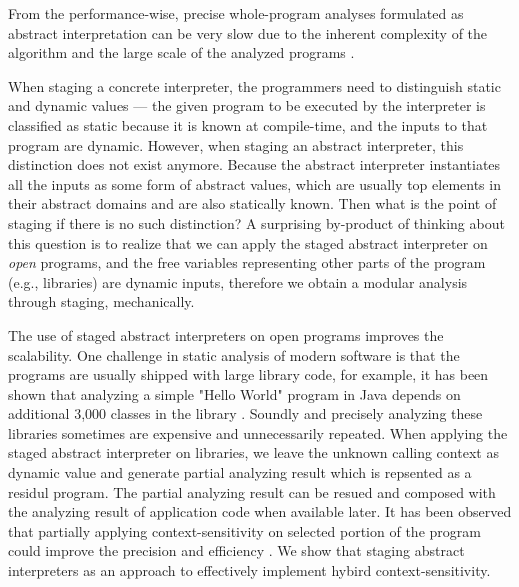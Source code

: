 

From the performance-wise, precise whole-program analyses formulated as abstract 
interpretation can be very slow due to the inherent complexity of the algorithm and the large scale 
of the analyzed programs \cite{toman_et_al:LIPIcs:2017:7121}. 

When staging a concrete interpreter, the programmers need to distinguish 
static and dynamic values --- the given program to be executed by the 
interpreter is classified as static because it is known at compile-time, 
and the inputs to that program are dynamic.  However, when staging an 
abstract interpreter, this distinction does not exist anymore. Because the 
abstract interpreter instantiates all the inputs as some form of abstract 
values, which are usually top elements in their abstract domains and are 
also statically known. 
Then what is the point of staging if there is no such distinction?
A surprising by-product of thinking about this question is to realize that 
we can apply the staged abstract interpreter on \textit{open} programs, and
the free variables representing other parts of the program (e.g., libraries) 
are dynamic inputs, therefore we obtain a modular analysis through staging, 
mechanically. 

The use of staged abstract interpreters on open programs improves the scalability. 
One challenge in static analysis of modern software is that the programs are usually 
shipped with large library code, for example, it has been shown that analyzing a simple
"Hello World" program in Java depends on additional 3,000 classes in the library \cite{DBLP:conf/oopsla/KulkarniMZN16}.
Soundly and precisely analyzing these libraries sometimes are expensive and unnecessarily repeated.
When applying the staged abstract interpreter on libraries, we leave the unknown 
calling context as dynamic value and generate partial analyzing result which is 
repsented as a residul program. The partial analyzing result can be resued and composed
with the analyzing result of application code when available later. 
It has been observed that partially applying context-sensitivity on selected portion of the program could
improve the precision and efficiency \cite{zipper2018, Kastrinis:2013:HCP:2491956.2462191}. 
We show that staging abstract interpreters as an approach to effectively implement hybird context-sensitivity\todo{}.


